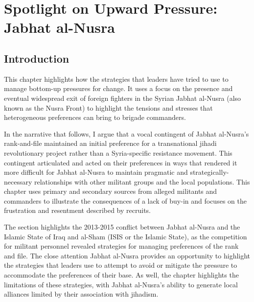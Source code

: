 \chapter{Spotlight on Upward Pressure: Jabhat al-Nusra}
\section{Introduction}

This chapter highlights how the strategies that leaders have tried to use to manage bottom-up pressures for change.  It uses a focus on the presence and eventual widespread exit of foreign fighters in the Syrian Jabhat al-Nusra (also known as the Nusra Front) to highlight the tensions and stresses that heterogeneous preferences can bring to brigade commanders. 

In the narrative that follows, I argue that a vocal contingent of Jabhat al-Nusra's rank-and-file maintained an initial preference for a transnational jihadi revolutionary project rather than a Syria-specific resistance movement. This contingent articulated and acted on their preferences in ways that rendered it more difficult for Jabhat al-Nusra to maintain pragmatic and strategically-necessary relationships with other militant groups and the local populations. This chapter uses primary and secondary sources from alleged militants and commanders to illustrate the consequences of a lack of buy-in and focuses on the frustration and resentment described by recruits.

The section highlights the 2013-2015 conflict between Jabhat al-Nusra and the Islamic State of Iraq and al-Sham (ISIS or the Islamic State), as the competition for militant personnel revealed strategies for managing preferences of the rank and file. The close attention Jabhat al-Nusra provides an opportunity to highlight the strategies that leaders use to attempt to avoid or mitigate the pressure to accommodate the preferences of their base.  As well, the chapter highlights the limitations of these strategies, with Jabhat al-Nusra's ability to generate local alliances limited by their association with jihadism.

